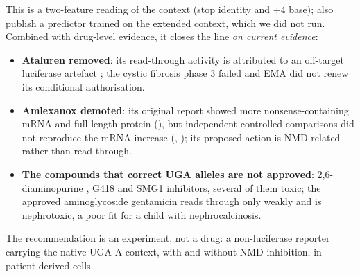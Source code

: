 \documentclass[10pt]{article}
\begin{document}
This is a two-feature reading of the context (stop identity and +4 base); \citet{mangk} also publish a predictor
trained on the extended context, which we did not run. Combined with drug-level evidence, it closes the line
\emph{on current evidence}:
\begin{itemize}
\item \textbf{Ataluren removed}: its read-through activity is attributed to an off-target luciferase artefact
  \citep{mcelroy}; the cystic fibrosis phase 3 failed and EMA did not renew its conditional authorisation.
\item \textbf{Amlexanox demoted}: its original report showed more nonsense-containing mRNA and full-length protein
  (), but independent controlled comparisons did not reproduce the mRNA increase (,
  ); its proposed action is NMD-related rather than read-through.
\item \textbf{The compounds that correct UGA alleles are not approved}: 2,6-diaminopurine \citep{trzaska}, G418 and
  SMG1 inhibitors, several of them toxic; the approved aminoglycoside gentamicin reads through only weakly and is
  nephrotoxic, a poor fit for a child with nephrocalcinosis.
\end{itemize}
The recommendation is an experiment, not a drug: a non-luciferase reporter carrying the native UGA-A context, with and
without NMD inhibition, in patient-derived cells.
\end{document}
